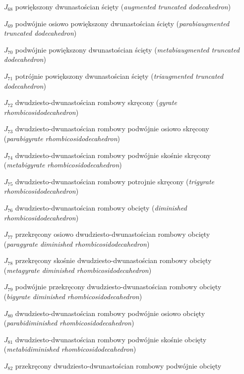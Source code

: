 \begin{itemize}
    \item [$J_{68}$] {powiększony dwunastościan ścięty}
                     (\emph{augmented truncated dodecahedron})
    \item [$J_{69}$] {podwójnie osiowo powiększony dwunastościan ścięty}
                     (\emph{parabiaugmented truncated dodecahedron})
    \item [$J_{70}$] {podwójnie powiększony dwunastościan ścięty}
                     (\emph{metabiaugmented truncated dodecahedron})
    \item [$J_{71}$] {potrójnie powiększony dwunastościan ścięty}
                     (\emph{triaugmented truncated dodecahedron})
    \item [$J_{72}$] {dwudziesto-dwunastościan rombowy skręcony}
                     (\emph{gyrate rhombicosidodecahedron})
    \item [$J_{73}$] {dwudziesto-dwunastościan rombowy podwójnie osiowo skręcony}
                     (\emph{parabigyrate rhombicosidodecahedron})
    \item [$J_{74}$] {dwudziesto-dwunastościan rombowy podwójnie skośnie skręcony}
                     (\emph{metabigyrate rhombicosidodecahedron})
    \item [$J_{75}$] {dwudziesto-dwunastościan rombowy potrojnie skręcony}
                     (\emph{trigyrate rhombicosidodecahedron})
    \item [$J_{76}$] {dwudziesto-dwunastościan rombowy obcięty}
                     (\emph{diminished rhombicosidodecahedron})
    \item [$J_{77}$] {przekręcony osiowo dwudziesto-dwunastościan rombowy obcięty}
                     (\emph{paragyrate diminished rhombicosidodecahedron})
    \item [$J_{78}$] {przekręcony skośnie dwudziesto-dwunastościan rombowy obcięty}
                     (\emph{metagyrate diminished rhombicosidodecahedron})
    \item [$J_{79}$] {podwójnie przekręcony dwudziesto-dwunastościan rombowy obcięty}
                     (\emph{bigyrate diminished rhombicosidodecahedron})
    \item [$J_{80}$] {dwudziesto-dwunastościan rombowy podwójnie osiowo obcięty}
                     (\emph{parabidiminished rhombicosidodecahedron})
    \item [$J_{81}$] {dwudziesto-dwunastościan rombowy podwójnie skośnie obcięty}
                     (\emph{metabidiminished rhombicosidodecahedron})
    \item [$J_{82}$] {przekręcony dwudziesto-dwunastościan rombowy podwójnie obcięty}

\end{itemize}
